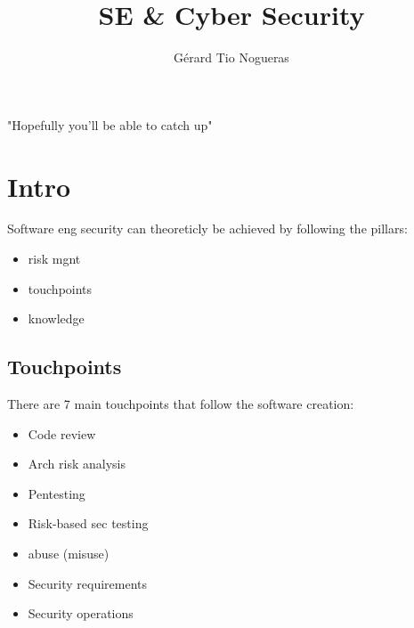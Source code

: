 \documentclass[10pt,a4paper]{article}
\author{Gérard Tio Nogueras}
\title{SE & Cyber Security}
\begin{document}
"Hopefully you'll be able to catch up"
\section{Intro}
Software eng security can theoreticly be achieved by following the pillars:
\begin{itemize}
\item risk mgnt
\item touchpoints
\item knowledge
\end{itemize}
\subsection{Touchpoints}
There are 7 main touchpoints that follow the software creation:
\begin{itemize}
\item Code review
\item Arch risk analysis
\item Pentesting
\item Risk-based sec testing
\item abuse (misuse)
\item Security requirements
\item Security operations
\end{itemize}
\end{document}
